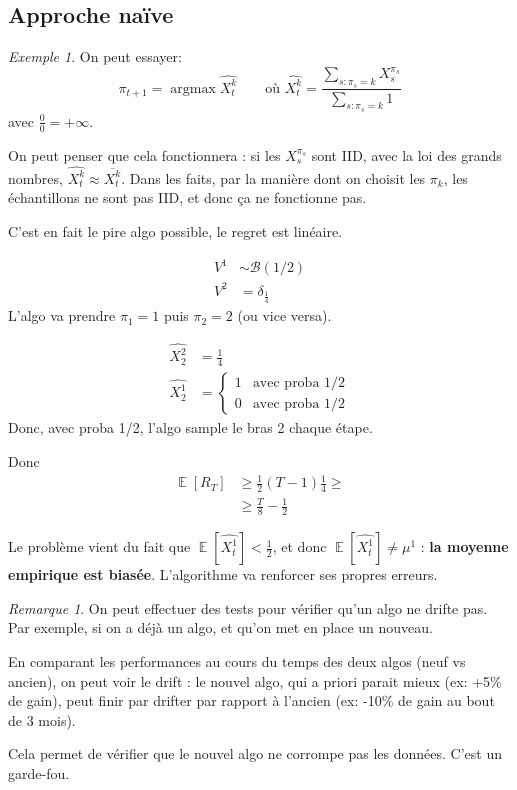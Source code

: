 \documentclass{article}
\DeclareMathOperator*{\argmax}{argmax}
\DeclareMathOperator*{\E}{\mathbb{E}}
\theoremstyle{remark}
\newtheorem{example}{Exemple}[section]
\theoremstyle{remark}
\newtheorem{remark}{Remarque}[section]
\begin{document}
\subsection{Approche naïve}

\begin{example}
   On peut essayer:
   $$
   \pi_{t+1} = \argmax \widehat{X_t^k} \quad \quad \text{où } \widehat{X_t^k} = \frac{\sum\limits_{s : \pi_s = k} X_s^{\pi_s}}{\sum\limits_{s : \pi_s = k} 1}
   $$
   avec $\frac{0}{0} = +\infty$.

   On peut penser que cela fonctionnera : si les $X_s^{\pi_s}$ sont IID, avec la loi des grands nombres, $\widehat{X_t^k} \approx \overline{X_t^k}$. Dans les faits, par la manière dont on choisit les $\pi_k$, les échantillons ne sont pas IID, et donc ça ne fonctionne pas.

   C'est en fait le pire algo possible, le regret est linéaire.

   \begin{align*}
      V^1 &\sim \mathcal{B}(1/2) \\
      V^2 &= \delta_{\frac{1}{4}}
   \end{align*}
   L'algo va prendre $\pi_1 = 1$ puis $\pi_2 = 2$ (ou vice versa).

   \begin{align*}
      \widehat{X_2^2} &= \frac{1}{4}\\
      \widehat{X_2^1} &= \left\{ \begin{array}{ll}
         1 & \text{avec proba 1/2} \\
         0 & \text{avec proba 1/2}
      \end{array} \right.
   \end{align*}
   Donc, avec proba 1/2, l'algo sample le bras 2  chaque étape.

   Donc
   \begin{align*}
      \E[R_T] &\geq \frac{1}{2}(T-1) \frac{1}{4} \geq \\
      &\geq \frac{T}{8} - \frac{1}{2}
   \end{align*}

   Le problème vient du fait que $\E[\widehat{X_t^1}] < \frac{1}{2}$, et donc $\E[\widehat{X_t^1}] \not= \mu^1$ : \textbf{la moyenne empirique est biasée}.
   L'algorithme va renforcer ses propres erreurs.
\end{example}

\begin{remark}
   On peut effectuer des tests pour vérifier qu'un algo ne drifte pas. Par exemple, si on a déjà un algo, et qu'on met en place un nouveau.

   En comparant les performances au cours du temps des deux algos (neuf vs ancien), on peut voir le drift : le nouvel algo, qui a priori parait mieux (ex: +5\% de gain), peut finir par drifter par rapport à l'ancien (ex: -10\% de gain au bout de 3 mois).

   Cela permet de vérifier que le nouvel algo ne corrompe pas les données. C'est un garde-fou.
\end{remark}
\end{document}

